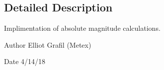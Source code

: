 \subsection{Detailed Description}
Implimentation of absolute magnitude calculations. 

\begin{DoxyAuthor}{Author}
Elliot Grafil (Metex) 
\end{DoxyAuthor}
\begin{DoxyDate}{Date}
4/14/18 
\end{DoxyDate}
